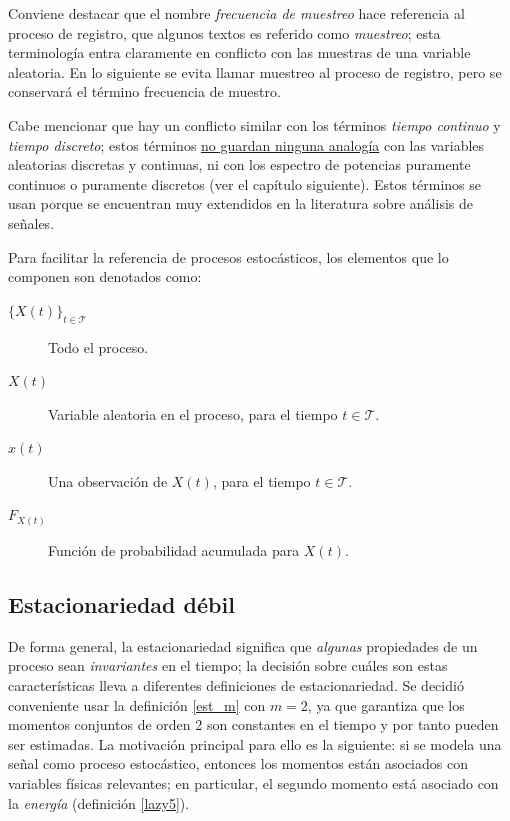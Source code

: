 \documentclass[12pt,letterpaper]{book}
\newcommand{\xt}{$\{X(t)\}_{t\in \mathcal{T}}$ }
\begin{document}
Conviene destacar que el nombre \textit{frecuencia de muestreo} hace referencia al proceso de registro, que algunos textos es referido como \textit{muestreo}; esta terminología entra claramente en conflicto con las muestras de una variable aleatoria. En lo siguiente se evita llamar muestreo al proceso de registro, pero se conservará el término frecuencia de muestro.

Cabe mencionar que hay un conflicto similar con los términos \textit{tiempo continuo} y \textit{tiempo discreto}; estos términos \underline{no guardan ninguna analogía} con las variables aleatorias discretas y continuas, ni con los espectro de potencias puramente continuos o puramente discretos (ver el capítulo siguiente).
%
Estos términos se usan porque se encuentran muy extendidos en la literatura sobre análisis de señales.

Para facilitar la referencia de procesos estocásticos, los elementos que lo componen son denotados como:
\begin{description}
\item[\xt]        Todo el proceso.
\item[$X(t)$]     Variable aleatoria en el proceso, para el tiempo $t \in \mathcal{T}$.
\item[$x(t)$]     Una observación de $X(t)$, para el tiempo $t \in \mathcal{T}$.
\item[$F_{X(t)}$] Función de probabilidad acumulada para $X(t)$.
\end{description}


\subsection{Estacionariedad débil}

De forma general, la estacionariedad significa que \textit{algunas} propiedades de un proceso sean \textit{invariantes} en el tiempo; la decisión sobre cuáles son estas características lleva a diferentes definiciones de estacionariedad.
%
Se decidió conveniente usar la definición \ref{est_m} con $m=2$, ya que garantiza que los momentos conjuntos de orden 2 son constantes en el tiempo y por tanto pueden ser estimadas.
%
La motivación principal para ello es la siguiente: si se modela una señal como proceso estocástico, entonces los momentos están asociados con variables físicas relevantes; en particular, el segundo momento está asociado con la \textit{energía} (definición \ref{lazy5}).
\end{document}
